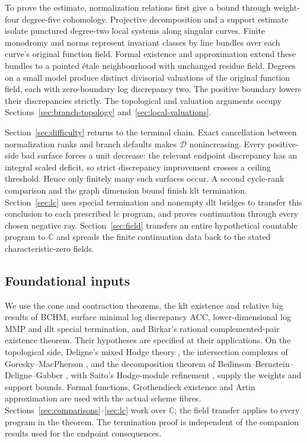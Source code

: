 To prove the estimate, normalization relations first give a bound
through weight-four degree-five cohomology.  Projective decomposition
and a support estimate isolate punctured degree-two local systems
along singular curves.  Finite monodromy and norms represent invariant
classes by line bundles over each curve's original function field.
Formal existence and approximation extend these bundles to a pointed \'etale
neighbourhood with unchanged residue field.  Degrees on a small
model produce distinct divisorial valuations of the original function
field, each with zero-boundary log discrepancy two.  The positive
boundary lowers their discrepancies strictly.  The topological and
valuation arguments occupy Sections~\ref{sec:branch-topology}
and~\ref{sec:local-valuations}.

Section~\ref{sec:difficulty} returns to the terminal chain.  Exact
cancellation between normalization ranks and branch defaults makes
$\mathcal D$ nonincreasing.  Every positive-side bad surface forces
a unit decrease: the relevant endpoint discrepancy has an integral
scaled deficit, so strict discrepancy improvement crosses a ceiling
threshold.  Hence only finitely many such surfaces occur.  A second
cycle-rank comparison and the graph dimension bound finish klt
termination.  Section~\ref{sec:lc} uses special termination and
nonempty dlt bridges to transfer this conclusion to each prescribed
lc program, and proves continuation through every chosen negative
ray.  Section~\ref{sec:field} transfers an entire hypothetical
countable program to $\mathbb C$ and spreads the finite continuation
data back to the stated characteristic-zero fields.

\subsection*{Foundational inputs}

We use the cone and contraction theorems, the klt existence and
relative big results of BCHM, surface minimal log discrepancy ACC,
lower-dimensional log MMP and dlt special termination, and Birkar's
rational complemented-pair existence theorem.  Their hypotheses are
specified at their applications.  On the topological side, Deligne's
mixed Hodge theory \cite{Deligne1971,Deligne1974}, the intersection
complexes of Goresky--MacPherson \cite{GM1983}, and the decomposition
theorem of Beilinson--Bernstein--Deligne--Gabber \cite{BBD1982}, with
Saito's Hodge-module refinement \cite{Saito1988,Saito1989}, supply
the weights and support bounds.  Formal functions, Grothendieck
existence and Artin approximation are used with the actual scheme
fibres.  Sections~\ref{sec:comparisons}--\ref{sec:lc} work over
$\mathbb C$; the field transfer applies to every program in the
theorem.  The termination proof is independent of the companion
results used for the endpoint consequences.
